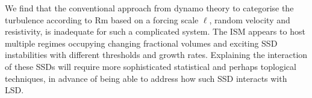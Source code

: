 \documentclass[preprint2]{aastex63}
\newcommand\pc{~ {\rm pc}}
\newcommand\dx{~ {\delta x}}
\begin{document}
We find that the conventional approach from dynamo theory to categorise the 
turbulence according to Rm based on a forcing scale $\ell$, random velocity and
resistivity, is inadequate for such a complicated system.
The ISM appears to host multiple regimes occupying changing fractional volumes
and exciting SSD instabilities with different thresholds and growth rates.
Explaining the interaction of these SSDs will require more sophisticated
statistical and perhaps toplogical techniques, in advance of being able to 
address how such SSD interacts with LSD.
\end{document}
